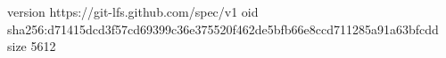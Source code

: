 version https://git-lfs.github.com/spec/v1
oid sha256:d71415dcd3f57cd69399c36e375520f462de5bfb66e8ccd711285a91a63bfcdd
size 5612
